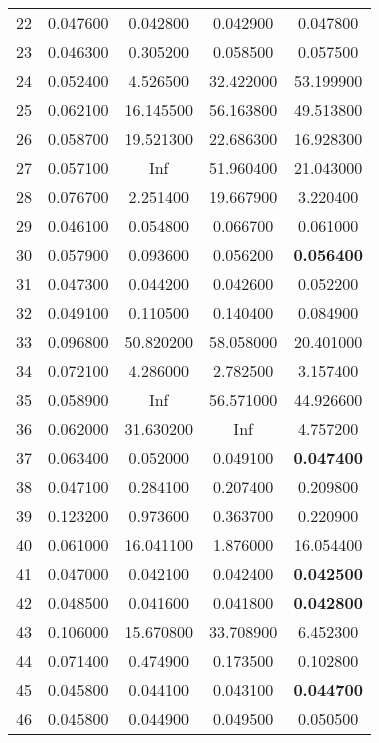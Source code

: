 \begin{longtable}{c|c|ccc}
22  &   0.047600  &   0.042800  &   0.042900   &   0.047800  \\
23  &   0.046300  &   0.305200  &   0.058500   &   0.057500  \\
24  &   0.052400  &   4.526500  &  32.422000   &  53.199900  \\
25  &   0.062100  &  16.145500  &  56.163800   &  49.513800  \\
26  &   0.058700  &  19.521300  &  22.686300   &  16.928300  \\
27  &   0.057100  &        Inf  &  51.960400   &  21.043000  \\
28  &   0.076700  &   2.251400  &  19.667900   &   3.220400  \\
29  &   0.046100  &   0.054800  &   0.066700   &   0.061000  \\
30  &   0.057900  &   0.093600  &   0.056200   &   \textbf{0.056400}  \\\hline
31  &   0.047300  &   0.044200  &   0.042600   &   0.052200  \\
32  &   0.049100  &   0.110500  &   0.140400   &   0.084900  \\
33  &   0.096800  &  50.820200  &  58.058000   &  20.401000  \\
34  &   0.072100  &   4.286000  &   2.782500   &   3.157400  \\
35  &   0.058900  &        Inf  &  56.571000   &  44.926600  \\
36  &   0.062000  &  31.630200  &        Inf   &   4.757200  \\
37  &   0.063400  &   0.052000  &   0.049100   &   \textbf{0.047400}  \\
38  &   0.047100  &   0.284100  &   0.207400   &   0.209800  \\
39  &   0.123200  &   0.973600  &   0.363700   &   0.220900  \\
40  &   0.061000  &  16.041100  &   1.876000   &  16.054400  \\ \hline
41  &   0.047000  &   0.042100  &   0.042400   &   \textbf{0.042500}  \\
42  &   0.048500  &   0.041600  &   0.041800   &   \textbf{0.042800}  \\
43  &   0.106000  &  15.670800  &  33.708900   &   6.452300  \\
44  &   0.071400  &   0.474900  &   0.173500   &   0.102800  \\
45  &   0.045800  &   0.044100  &   0.043100   &   \textbf{0.044700}  \\
46  &   0.045800  &   0.044900  &   0.049500   &   0.050500  \\

\end{longtable}
